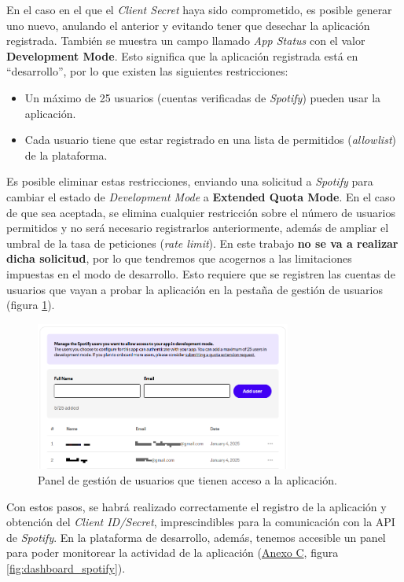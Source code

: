 En el caso en el que el \textit{Client Secret} haya sido comprometido, es posible generar uno nuevo, anulando el anterior y evitando tener que desechar la aplicación registrada. También se muestra un campo llamado \textit{App Status} con el valor \textbf{Development Mode}. Esto significa que la aplicación registrada está en ``desarrollo'', por lo que existen las siguientes restricciones:

\begin{itemize}
    \item Un máximo de 25 usuarios (cuentas verificadas de \textit{Spotify}) pueden usar la aplicación.
    \item Cada usuario tiene que estar registrado en una lista de permitidos (\textit{allowlist}) de la plataforma.
\end{itemize}

Es posible eliminar estas restricciones, enviando una solicitud a \textit{Spotify} para cambiar el estado de \textit{Development Mode} a \textbf{Extended Quota Mode}. En el caso de que sea aceptada, se elimina cualquier restricción sobre el número de usuarios permitidos y no será necesario registrarlos anteriormente, además de ampliar el umbral de la tasa de peticiones (\textit{rate limit}). En este trabajo \textbf{no se va a realizar dicha solicitud}, por lo que tendremos que acogernos a las limitaciones impuestas en el modo de desarrollo. Esto requiere que se registren las cuentas de usuarios que vayan a probar la aplicación en la pestaña de gestión de usuarios (figura \ref{fig:user_management}).

\begin{figure}[H]
    \centering
    \includegraphics[width=0.75\textwidth]{figures/registro_spotify/user_management.png}
    \caption{Panel de gestión de usuarios que tienen acceso a la aplicación.}
    \label{fig:user_management}
\end{figure}

Con estos pasos, se habrá realizado correctamente el registro de la aplicación y obtención del \textit{Client ID/Secret}, imprescindibles para la comunicación con la API de \textit{Spotify}. En la plataforma de desarrollo, además, tenemos accesible un panel para poder monitorear la actividad de la aplicación (\hyperref[ch:anexoC]{Anexo C}, figura \ref{fig:dashboard_spotify}).

